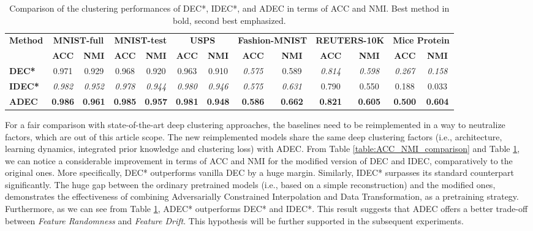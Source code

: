 \documentclass{article}
\begin{document}
\begin{table}
  \caption{Comparison of the clustering performances of DEC*, IDEC*, and ADEC in terms of ACC and NMI. Best method in bold, second best emphasized.}
  \vskip 0.15in
  \begin{center}
  \begin{small}
  \begin{tabular}{|p{2.45cm}|c|c|c|c|c|c|c|c|c|c|c|c|}
    \hline
    {\textbf{Method}} & \multicolumn{2}{c|}{\textbf{MNIST-full}} & \multicolumn{2}{c|}{\textbf{MNIST-test}} & \multicolumn{2}{c|}{\textbf{USPS}} & \multicolumn{2}{c|}{\textbf{Fashion-MNIST}} & \multicolumn{2}{c|}{\textbf{REUTERS-10K}}& \multicolumn{2}{c|}{\textbf{Mice Protein}}\\
\cline{2-13}
    & \textbf{ACC} & \textbf{NMI} & \textbf{ACC} & \textbf{NMI} & \textbf{ACC} & \textbf{NMI} & \textbf{ACC} & \textbf{NMI} & \textbf{ACC} & \textbf{NMI} & \textbf{ACC} & \textbf{NMI} \\ \hline
    \textbf{DEC*} & 0.971 & 0.929 & 0.968 & 0.920 & 0.963 & 0.910 & \textit{0.575} & 0.589 & \textit{0.814}  &\textit{0.598}  &  \textit{0.267}  & \textit{0.158} \\ \hline
    \textbf{IDEC*} & \textit{0.982} & \textit{0.952} & \textit{0.978} & \textit{0.944} & \textit{0.980} & \textit{0.946} & \textit{0.575} & \textit{0.631} & 0.790  & 0.550  & 0.188  & 0.033  \\ \hline
    \textbf{ADEC} & \textbf{0.986} & \textbf{0.961} & \textbf{0.985} & \textbf{0.957} & \textbf{0.981} & \textbf{0.948} & \textbf{0.586} & \textbf{0.662} & \textbf{0.821 } & \textbf{0.605 } &  \textbf{0.500 } & \textbf{0.604 } \\ \hline 
  \end{tabular}
  \label{table:fair_comparison}
  \end{small}
  \end{center}
  \vskip -0.1in
\end{table}

For a fair comparison with state-of-the-art deep clustering approaches, the baselines need to be reimplemented in a way to neutralize factors, which are out of this article scope. The new reimplemented models share the same deep clustering factors (i.e., architecture, learning dynamics, integrated prior knowledge and clustering loss) with ADEC. From Table \ref{table:ACC_NMI_comparison} and Table \ref{table:fair_comparison}, we can notice a considerable improvement in terms of ACC and NMI for the modified version of DEC and IDEC, comparatively to the original ones. More specifically, DEC* outperforms vanilla DEC by a huge margin. Similarly, IDEC* surpasses its standard counterpart significantly. The huge gap between the ordinary pretrained models (i.e., based on a simple reconstruction) and the modified ones, demonstrates the effectiveness of combining Adversarially Constrained Interpolation and Data Transformation, as a pretraining strategy. Furthermore, as we can see from Table \ref{table:fair_comparison}, ADEC* outperforms DEC* and IDEC*. This result suggests that ADEC offers a better trade-off between \textit{Feature Randomness} and \textit{Feature Drift}. This hypothesis will be further supported in the subsequent experiments.
\end{document}
